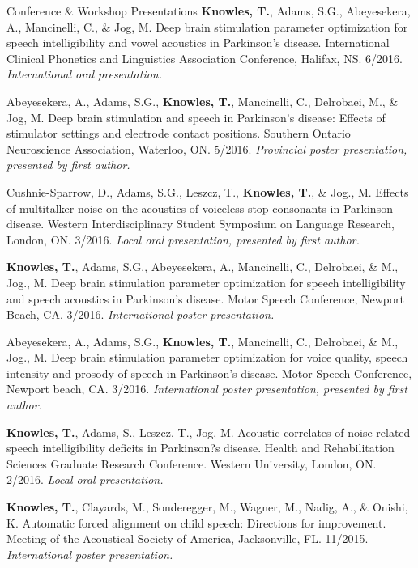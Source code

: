 \documentclass{resume} %
\begin{document}
\begin{rSection}{Conference \& Workshop Presentations}
	{\bf Knowles, T.}, Adams, S.G., Abeyesekera, A., Mancinelli, C., \& Jog, M. Deep brain stimulation parameter optimization for speech intelligibility and vowel acoustics in Parkinson's disease. International Clinical Phonetics and Linguistics Association Conference, Halifax, NS. 6/2016. \emph{International oral presentation.}
	
	
	Abeyesekera, A., Adams, S.G., {\bf Knowles, T.}, Mancinelli, C., Delrobaei, M., \& Jog, M. Deep brain stimulation and speech in Parkinson's disease: Effects of stimulator settings and electrode contact positions. Southern Ontario Neuroscience Association, Waterloo, ON. 5/2016. \emph{Provincial poster presentation, presented by first author.}
	
	Cushnie-Sparrow, D., Adams, S.G., Leszcz, T., {\bf Knowles, T.},  \& Jog., M. Effects of multitalker noise on the acoustics of voiceless stop consonants in Parkinson disease. Western Interdisciplinary Student Symposium on Language Research, London, ON. 3/2016. \emph{Local oral presentation, presented by first author.}
	
	
	{\bf Knowles, T.}, Adams, S.G., Abeyesekera, A., Mancinelli, C., Delrobaei, \& M., Jog., M. Deep brain stimulation parameter optimization for speech intelligibility and speech acoustics in Parkinson's disease. Motor Speech Conference, Newport Beach, CA. 3/2016. \emph{International poster presentation.}
	
	Abeyesekera, A., Adams, S.G., {\bf Knowles, T.}, Mancinelli, C., Delrobaei, \& M., Jog., M. Deep brain stimulation parameter optimization for voice quality, speech intensity and prosody of speech in Parkinson's disease. Motor Speech Conference, Newport beach, CA. 3/2016. \emph{International poster presentation, presented by first author.}
	
	{\bf Knowles, T.}, Adams, S., Leszcz, T., Jog, M. Acoustic correlates of noise-related speech intelligibility deficits in Parkinson?s disease. Health and Rehabilitation Sciences Graduate Research Conference. Western University, London, ON. 2/2016. \emph{Local oral presentation.}
	
	{\bf Knowles, T.}, Clayards, M., Sonderegger, M., Wagner, M., Nadig, A., \& Onishi, K. Automatic forced alignment on child speech: Directions for improvement. Meeting of the Acoustical Society of America, Jacksonville, FL. 11/2015. \emph{International poster presentation.}
	

\end{rSection}
\end{document}
